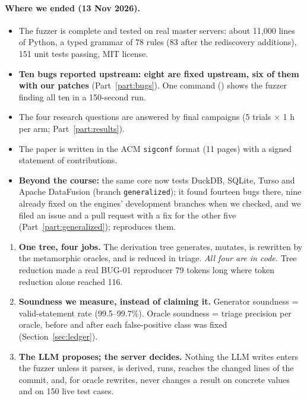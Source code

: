 \paragraph{Where we ended (13 Nov 2026).}
\begin{itemize}
  \item The fuzzer is complete and tested on real \pg master servers: about
    11{,}000 lines of Python, a typed grammar of 78 rules (83 after the rediscovery additions), 151 unit tests passing,
    MIT license.
  \item \textbf{Ten \pg bugs reported upstream: eight are fixed upstream, six of
    them with our patches} (Part~\ref{part:bugs}). One
    command () shows the fuzzer finding all ten in a
    150-second run.
  \item The four research questions are answered by final campaigns
    (5 trials $\times$ 1 h per arm; Part~\ref{part:results}).
  \item The paper is written in the ACM \texttt{sigconf} format (11 pages) with a
    signed statement of contributions.
  \item \textbf{Beyond the course:} the same core now tests DuckDB, SQLite, Turso
    and Apache DataFusion (branch \texttt{generalized}); it found fourteen bugs there,
    nine already fixed on the engines' development branches when we checked, and we
    filed an issue and a pull request with a fix for the other five
    (Part~\ref{part:generalized});  reproduces them.
\end{itemize}

\begin{keybox}
\begin{enumerate}
  \item \textbf{One tree, four jobs.} The derivation tree generates, mutates,
    is rewritten by the metamorphic oracles, and is reduced in triage.
    \emph{All four are in code.} Tree reduction made a real BUG-01 reproducer
    79 tokens long where token reduction alone reached 116.
  \item \textbf{Soundness we measure, instead of claiming it.} Generator
    soundness = valid-statement rate (99.5--99.7\%). Oracle soundness =
    triage precision per oracle, before and after each false-positive class was
    fixed (Section~\ref{sec:ledger}).
  \item \textbf{The LLM proposes; the server decides.} Nothing the LLM writes
    enters the fuzzer unless it parses, is derived, runs, reaches the changed
    lines of the commit, and, for oracle rewrites, never changes a result on
    concrete values and on 150 live test cases.
\end{enumerate}
\end{keybox}

